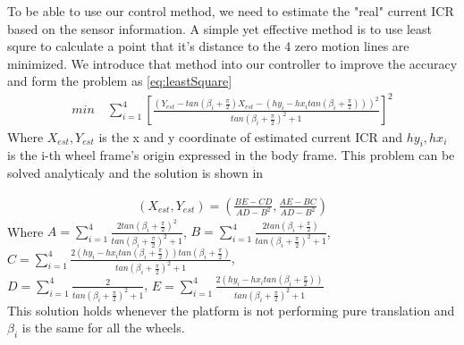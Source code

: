 To be able to use our control method, we need to estimate the "real" current ICR based on the sensor information. A simple yet effective method is to use least squre to calculate a point that it's distance to the 
4 zero motion lines are minimized\cite{ICRestimation}. We introduce that method into our controller to improve the accuracy and form the problem as \cref{eq:leastSquare}
\begin{equation}\label{eq:leastSquare}
	\begin{split}
		min \quad \sum_{i=1}^{4} [\frac{(Y_{est} - tan(\beta_i+\frac{\pi}{2})X_{est} - (hy_i-hx_itan(\beta_i+\frac{\pi}{2})))^2}{tan(\beta_i+\frac{\pi}{2})^2+1}]^2
	\end{split}
\end{equation}
Where $X_{est},Y_{est}$ is the x and y coordinate of estimated current ICR and $hy_i,hx_i$ is the i-th wheel frame's origin expressed in the body frame. This problem can be solved analyticaly and the solution is 
shown in

\begin{equation}\label{eq:leastSquareSolution}
	\begin{split}
		(X_{est},Y_{est})=(\frac{BE-CD}{AD-B^2},\frac{AE-BC}{AD-B^2})
	\end{split}
\end{equation}
Where $A=\sum_{i=1}^{4}\frac{2tan(\beta_i+\frac{\pi}{2})^2}{tan(\beta_i+\frac{\pi}{2})^2+1}$, $B=\sum_{i=1}^{4}\frac{2tan(\beta_i+\frac{\pi}{2})}{tan(\beta_i+\frac{\pi}{2})^2+1}$, \\
$C=\sum_{i=1}^{4}\frac{2(hy_i-hx_itan(\beta_i+\frac{\pi}{2}))tan(\beta_i+\frac{\pi}{2})}{tan(\beta_i+\frac{\pi}{2})^2+1}$,\\ $D=\sum_{i=1}^{4}\frac{2}{tan(\beta_i+\frac{\pi}{2})^2+1}$, 
$E =\sum_{i=1}^{4}\frac{2(hy_i-hx_itan(\beta_i+\frac{\pi}{2}))}{tan(\beta_i+\frac{\pi}{2})^2+1}$\\

This solution holds whenever the platform is not performing pure translation and $\beta_i$ is the same for all the wheels.



